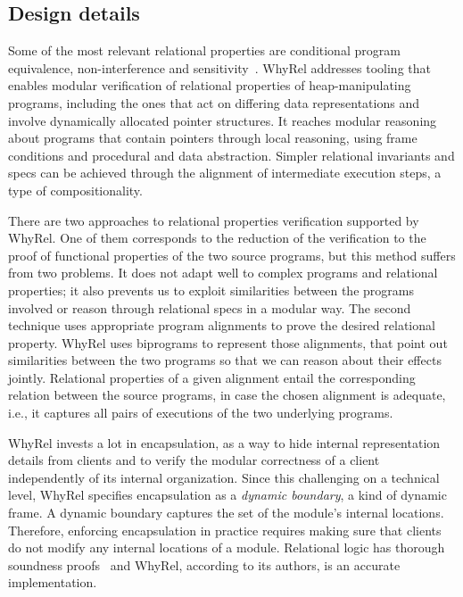 \subsection{Design details}
\label{subsec:whyrel_deisgn}

Some of the most relevant relational properties are conditional program equivalence, non-interference and sensitivity~\cite{barthe2019verifying}.
WhyRel addresses tooling that enables modular verification of relational properties of heap-manipulating programs, including the ones that act on differing data representations and involve dynamically allocated pointer structures.
It reaches modular reasoning about programs that contain pointers through local reasoning, using frame conditions and procedural and data abstraction.
Simpler relational invariants and specs can be achieved through the alignment of intermediate execution steps, a type of compositionality.

There are two approaches to relational properties verification supported by WhyRel.
One of them corresponds to the reduction of the verification to the proof of functional properties of the two source programs, but this method suffers from two problems.
It does not adapt well to complex programs and relational properties; it also prevents us to exploit similarities between the programs involved or reason through relational specs in a modular way.
The second technique uses appropriate program alignments to prove the desired relational property.
WhyRel uses biprograms to represent those alignments, that point out similarities between the two programs so that we can reason about their effects jointly.
Relational properties of a given alignment entail the corresponding relation between the source programs, in case the chosen alignment is adequate, i.e., it captures all pairs of executions of the two underlying programs.

WhyRel invests a lot in encapsulation, as a way to hide internal representation details from clients and to verify the modular correctness of a client independently of its internal organization.
Since this challenging on a technical level, WhyRel specifies encapsulation as a \emph{dynamic boundary}, a kind of dynamic frame.
A dynamic boundary captures the set of the module's internal locations.
Therefore, enforcing encapsulation in practice requires making sure that clients do not modify any internal locations of a module.
Relational logic has thorough soundness proofs~\cite{10.1145/3551497} and WhyRel, according to its authors, is an accurate implementation.

